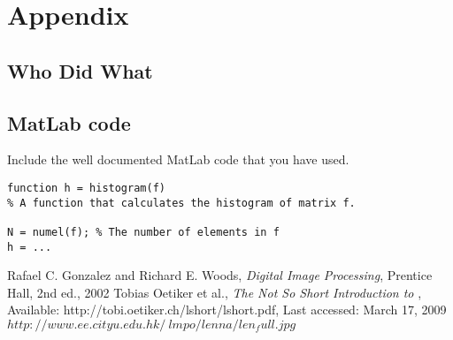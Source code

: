 \documentclass[a4paper]{article}
\begin{document}
\section*{Appendix}

\subsection*{Who Did What}


\subsection*{MatLab code}
Include the well documented MatLab code that you have used.
\begin{verbatim}
function h = histogram(f)
% A function that calculates the histogram of matrix f.

N = numel(f); % The number of elements in f
h = ...
\end{verbatim}


\begin{thebibliography}{99}
 Rafael C. Gonzalez and Richard E. Woods,
  \textsl{Digital Image Processing},
  Prentice Hall, 2nd ed., 2002
 Tobias Oetiker et al.,
  \textsl{The Not So Short Introduction to \LaTeXe},
  Available: http://tobi.oetiker.ch/lshort/lshort.pdf,
  Last accessed: March 17, 2009
 $http://www.ee.cityu.edu.hk/~lmpo/lenna/len_full.jpg$

\end{thebibliography}
\end{document}
